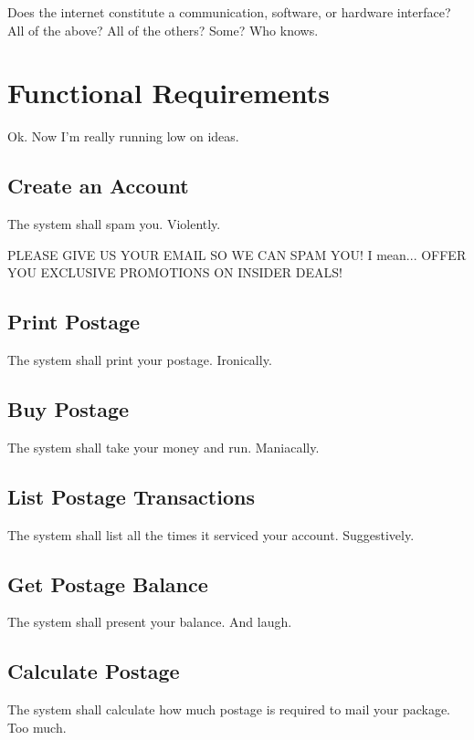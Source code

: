 \documentclass{scrreprt}
\begin{document}
Does the internet constitute a communication, software, or hardware 
interface? All of the above? All of the others? Some? Who knows.

\section{Functional Requirements}

Ok. Now I'm really running low on ideas.

\subsection{Create an Account}

The system shall spam you. Violently.

PLEASE GIVE US YOUR EMAIL SO WE CAN SPAM YOU! I mean... 
OFFER YOU EXCLUSIVE PROMOTIONS ON INSIDER DEALS!

\subsection{Print Postage}

The system shall print your postage. Ironically.

\subsection{Buy Postage}

The system shall take your money and run. Maniacally.

\subsection{List Postage Transactions}

The system shall list all the times it serviced your account. Suggestively.

\subsection{Get Postage Balance}

The system shall present your balance. And laugh.

\subsection{Calculate Postage}

The system shall calculate how much postage is required to mail your package. 
Too much.
\end{document}
